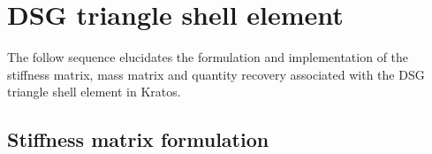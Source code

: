 





\setcounter{MaxMatrixCols}{20}




\chapter{DSG triangle shell element}
\label{chap:chapter_3}

\renewcommand{\Thema}{DSG triangle shell element}

The follow sequence elucidates the formulation and implementation of the stiffness matrix, mass matrix and quantity recovery associated with the DSG triangle shell element in Kratos. 

\section{Stiffness matrix formulation}

